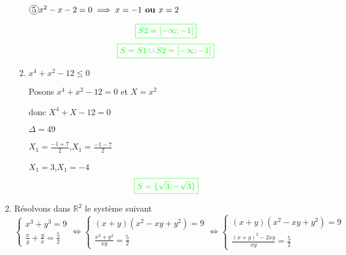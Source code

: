 \documentclass[12pt,a4paper]{article}
\begin{document}
\begin{enumerate}
\begin{enumerate}
\( \encercle{5} x^2 - x - 2 = 0 \implies x=-1 \textbf{ ou } x= 2\)
\begin{flushleft}
\end{flushleft}
\[
\textcolor{green}{\boxed{S2 = \left]-\infty ; -1\right[  }} 
\]
\[
\textcolor{green}{\boxed{S=S1 \cup S2 = \left]-\infty ; -1\right[  }} 
\]
\item $x^4 + x^2 - 12 \leq 0$

Posons $x^4 + x^2 - 12 = 0$ et  $X=x^2$

donc $X^4 + X - 12 = 0$

$\Delta = 49$

$X_{1}=\frac{-1+7}{2}$,$X_{1}=\frac{-1-7}{2}$

$X_{1}=3$,$X_{1}=-4 	$
\[
\textcolor{green}{\boxed{S = \{ \sqrt{3} ; -\sqrt{3} \}   }} 
\]
\end{enumerate}
    \item Résolvons dans $\mathbb{R}^2$ le système suivant
    \[
    \begin{cases}
        x^3 + y^3 = 9 \\
        \frac{x}{y} + \frac{y}{x} = \frac{5}{2}
    \end{cases} \iff
        \begin{cases}
        (x+y)(x^{2}-xy+y^{2}) = 9 \\
        \frac{x^{2}+y^{2}}{xy} = \frac{5}{2}
    \end{cases}\iff
            \begin{cases}
        (x+y)(x^{2}-xy+y^{2}) = 9 \\
        \frac{(x+y)^{2}-2xy}{xy} = \frac{5}{2}
    \end{cases}
    \]
    

\end{enumerate}
\end{document}
